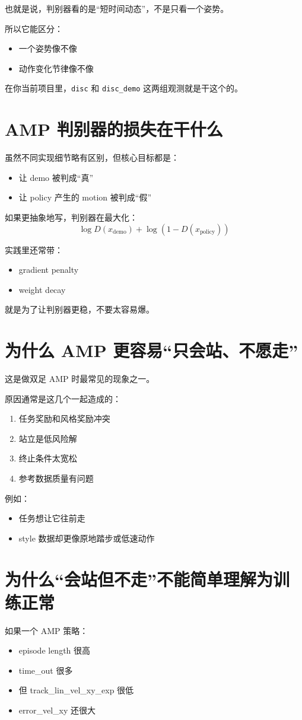 \documentclass[11pt,a4paper]{article}
\begin{document}
也就是说，判别器看的是“短时间动态”，不是只看一个姿势。

所以它能区分：
\begin{itemize}
\item 一个姿势像不像
\item 动作变化节律像不像
\end{itemize}

在你当前项目里，\texttt{disc} 和 \texttt{disc\_demo} 这两组观测就是干这个的。

\section{AMP 判别器的损失在干什么}
虽然不同实现细节略有区别，但核心目标都是：
\begin{itemize}
\item 让 demo 被判成“真”
\item 让 policy 产生的 motion 被判成“假”
\end{itemize}

如果更抽象地写，判别器在最大化：
\[
\log D(x_{\text{demo}}) + \log(1-D(x_{\text{policy}}))
\]

实践里还常带：
\begin{itemize}
\item gradient penalty
\item weight decay
\end{itemize}

就是为了让判别器更稳，不要太容易爆。

\section{为什么 AMP 更容易“只会站、不愿走”}
这是做双足 AMP 时最常见的现象之一。

原因通常是这几个一起造成的：
\begin{enumerate}
\item 任务奖励和风格奖励冲突
\item 站立是低风险解
\item 终止条件太宽松
\item 参考数据质量有问题
\end{enumerate}

例如：
\begin{itemize}
\item 任务想让它往前走
\item style 数据却更像原地踏步或低速动作
\end{itemize}

\section{为什么“会站但不走”不能简单理解为训练正常}
如果一个 AMP 策略：
\begin{itemize}
\item episode length 很高
\item time\_out 很多
\item 但 track\_lin\_vel\_xy\_exp 很低
\item error\_vel\_xy 还很大
\end{itemize}
\end{document}
